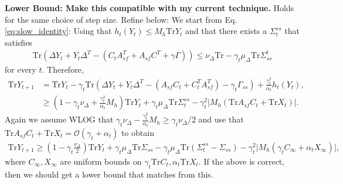 

\textbf{Lower Bound: {\color{red}Make this compatible with my current technique.}} Holds for the same choice of step size. {\color{red}Refine below:}
We start from Eq. \eqref{eq:slow_identity}: Using that $h_t (Y_t) \leq M_h \mathrm{Tr} Y_t$ and that there exists a $\Sigma_t^{ss}$ that satisfies
\begin{align*}
    \mathrm{Tr}\left( \Delta Y_t + Y_t \Delta^T - (C_t A_{sf}^T + A_{sf} C^T + \gamma \Gamma)\right)
    \leq \nu_\Delta \mathrm{Tr} - \gamma_t \mu_\Delta \mathrm{Tr} \Sigma^t_{ss} 
\end{align*}
for every $t$.
Therefore,
\begin{align*}
    \mathrm{Tr}Y_{t+1} &= \mathrm{Tr} Y_t - \gamma_t \mathrm{Tr}\left(\Delta Y_t 
    + Y_t \Delta^T - (A_{sf} C_t + C_t^T A_{sf}^T) - \gamma_t \Gamma_{ss}  \right)
    + \frac{\gamma_t^2}{\alpha_t} h_t (Y_t) ,   
    \\ &
    \geq \left(1 - \gamma_t \nu_\Delta + \frac{\gamma_t^2}{\alpha_t} M_h \right) \mathrm{Tr} Y_t
    + \gamma_t \mu_\Delta \mathrm{Tr} \Sigma^{ss}_t 
    -  \gamma_t^2 \lvert M_h \left(\mathrm{Tr} A_{sf} C_t + \mathrm{Tr} X_t\right) \rvert .
\end{align*}
Again we assume WLOG that $\gamma_t \nu_\Delta - \frac{\gamma_t^2}{\alpha_t} M_h \geq \gamma_t \nu_\Delta / 2$ and use that $\mathrm{Tr} A_{sf} C_t + \mathrm{Tr} X_t = \mathcal{O}(\gamma_t + \alpha_t)$ to obtain
\begin{align*}
    \mathrm{Tr} Y_{t+1} \geq \left(1 - \gamma_t \frac{\nu_\Delta}{2}\right) \mathrm{Tr} Y_t + \gamma_t \mu_\Delta \mathrm{Tr} \Sigma_{ss}
    - \gamma_t \mu_\Delta \mathrm{Tr}(\Sigma_t^{ss} -  \Sigma_{ss}) - \gamma_t^2 \lvert M_h (\gamma_t C_\infty + \alpha_t X_\infty) \rvert ,
\end{align*}
where $C_\infty, X_\infty$ are uniform bounds on $\gamma_t \mathrm{Tr} C_t, \alpha_t \mathrm{Tr} X_t$.
{\color{red}If the above is correct, then we should get a lower bound that matches from this. }
